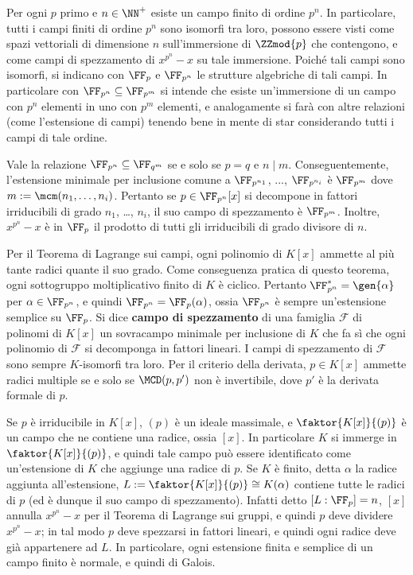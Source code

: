 \documentclass[10pt,landscape]{article}
\begin{document}
\begin{multicols}{3}
		
		Per ogni $p$ primo e $n \in \NN^+$ esiste un campo finito
		di ordine $p^n$. In particolare, tutti i campi finiti di
		ordine $p^n$ sono isomorfi tra loro, possono essere visti
		come spazi vettoriali di dimensione $n$ sull'immersione di $\ZZmod{p}$ che contengono,
		e come campi di spezzamento di $x^{p^n}-x$
		su tale immersione. Poiché tali campi sono isomorfi,
		si indicano con $\FF_p$ e $\FF_{p^n}$ le strutture
		algebriche di tali campi. In particolare con
		$\FF_{p^n} \subseteq \FF_{p^m}$ si intende che
		esiste un'immersione di un campo con $p^n$ elementi in
		uno con $p^m$ elementi, e analogamente si farà con
		altre relazioni (come l'estensione di campi)
		tenendo bene in mente di star
		considerando tutti i campi di tale ordine. \medskip
		
		
		Vale la relazione $\FF_{p^n} \subseteq \FF_{q^m}$
		se e solo se $p=q$ e $n \mid m$. Conseguentemente,
		l'estensione minimale per inclusione comune a
		$\FF_{p^{n_1}}$, ..., $\FF_{p^{n_i}}$ è
		$\FF_{p^m}$ dove $m := \mcm(n_1, \ldots, n_i)$. Pertanto
		se $p \in \FF_{p^n}[x]$ si decompone in fattori irriducibili
		di grado $n_1$, \ldots, $n_i$, il suo campo di spezzamento
		è $\FF_{p^m}$. Inoltre, $x^{p^n}-x$ è in $\FF_p$ il
		prodotto di tutti gli irriducibili di grado divisore
		di $n$.
		
		
		Per il Teorema di Lagrange sui campi, ogni polinomio
		di $K[x]$ ammette al più tante radici quante il suo grado.
		Come conseguenza pratica di questo teorema, ogni sottogruppo
		moltiplicativo finito di $K$ è ciclico. Pertanto
		$\FF_{p^n}^* = \gen{\alpha}$ per $\alpha \in \FF_{p^n}$,
		e quindi $\FF_{p^n} = \FF_p(\alpha)$, ossia
		$\FF_{p^n}$ è sempre un'estensione semplice su $\FF_p$. Si dice
		\textbf{campo di spezzamento} di una famiglia $\mathcal{F}$
		di polinomi di $K[x]$ un sovracampo minimale per
		inclusione di $K$ che fa sì che ogni polinomio di $\mathcal{F}$ si decomponga in fattori lineari. I campi
		di spezzamento di $\mathcal{F}$ sono sempre
		$K$-isomorfi tra loro. Per il criterio della derivata,
		$p \in K[x]$ ammette radici multiple se e solo se
		$\MCD(p, p')$ non è invertibile, dove $p'$ è la derivata
		formale di $p$. \medskip
		
		
		Se $p$ è irriducibile in $K[x]$, $(p)$ è un ideale
		massimale, e $\faktor{K[x]}{(p)}$ è un campo che
		ne contiene una radice, ossia $[x]$. In
		particolare $K$ si immerge in $\faktor{K[x]}{(p)}$,
		e quindi tale campo può essere identificato come
		un'estensione di $K$ che aggiunge una radice di $p$.
		Se $K$ è finito, detta $\alpha$ la radice aggiunta
		all'estensione, $L := \faktor{K[x]}{(p)} \cong K(\alpha)$ contiene
		tutte le radici di $p$ (ed è dunque il suo campo
		di spezzamento). Infatti detto $[L : \FF_p] = n$,
		$[x]$ annulla $x^{p^n}-x$ per il Teorema di Lagrange
		sui gruppi, e quindi $p$ deve dividere $x^{p^n}-x$;
		in tal modo $p$ deve spezzarsi in fattori lineari,
		e quindi ogni radice deve già appartenere ad $L$.
		In particolare, ogni estensione finita e semplice
		di un campo finito è normale, e quindi di Galois. \medskip
		

\end{multicols}
\end{document}
